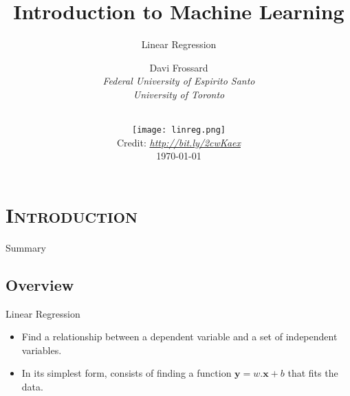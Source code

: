 \documentclass[xcolor=x11names,compress]{beamer}
\renewcommand{\(}{\begin{columns}}
\renewcommand{\)}{\end{columns}}
\newcommand{\<}[1]{\begin{column}{#1}}
\renewcommand{\>}{\end{column}}
\begin{document}
\section{\scshape Introduction}
\begin{frame}
\title{Introduction to Machine Learning}
\subtitle{Linear Regression}
\author{
	Davi Frossard\\
	{\it Federal University of Espirito Santo \\ University of Toronto}\\
}
\date{
    \vspace{-2em}\\
    \texttt{[image: linreg.png]}\\[-1ex]
    {\tiny Credit: {\itshape \url{http://bit.ly/2cwKaex}}}
    \\
	\today
}
\titlepage
\end{frame}

\begin{frame}{Summary}
\tableofcontents
\end{frame}

\subsection{Overview}
\begin{frame}{Linear Regression}
	\begin{itemize}
		\item Find a relationship between a dependent variable and a set of independent variables.
		\item In its simplest form, consists of finding a function $\boldsymbol{y} = w.\boldsymbol{x} + b$ that fits the data.
		\begin{center}
		\end{center}
	\end{itemize}
\end{frame}

\end{document}
